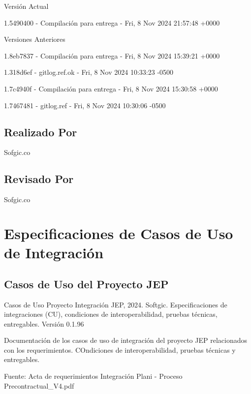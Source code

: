 \documentclass[
  paper=a4,
  ,captions=tableheading
]{scrartcl}
\renewenvironment{quote}{\begin{customblockquote}\list{}{\rightmargin=0em\leftmargin=0em}%
\item\relax\color{blockquote-text}\ignorespaces}{\unskip\unskip\endlist\end{customblockquote}}
\begin{document}
\begin{quote}
\end{quote}

Versión Actual

1.5490400 - Compilación para entrega - Fri, 8 Nov 2024 21:57:48 +0000

Versiones Anteriores

1.8eb7837 - Compilación para entrega - Fri, 8 Nov 2024 15:39:21 +0000

1.318d6ef - gitlog.ref.ok - Fri, 8 Nov 2024 10:33:23 -0500

1.7c4940f - Compilación para entrega - Fri, 8 Nov 2024 15:30:58 +0000

1.7467481 - gitlog.ref - Fri, 8 Nov 2024 10:30:06 -0500

\subsection{Realizado Por}\label{sec:realizado-por}

Sofgic.co

\subsection{Revisado Por}\label{sec:revisado-por}

Sofgic.co

\newpage

\section{Especificaciones de Casos de Uso de
Integración}\label{sec:especificaciones-de-casos-de-uso-de-integraciuxf3n}

\subsection{Casos de Uso del Proyecto
JEP}\label{sec:casos-de-uso-del-proyecto-jep}

\begin{quote}
Casos de Uso Proyecto Integración JEP, 2024. Softgic. Especificaciones
de integraciones (CU), condiciones de interoperabilidad, pruebas
técnicas, entregables. Versión 0.1.96
\end{quote}

Documentación de los casos de uso de integración del proyecto JEP
relacionados con los requerimientos. COndiciones de interoperabilidad,
pruebas técnicas y entregables.

Fuente: Acta de requerimientos Integración Plani - Proceso
Precontractual\_V4.pdf
\end{document}
